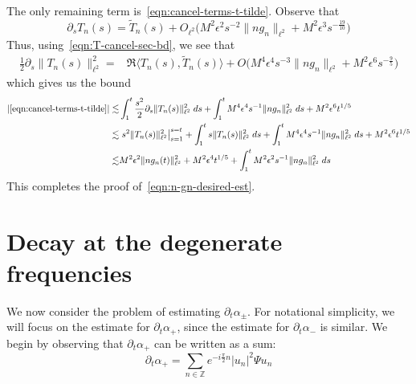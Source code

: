\documentclass[letterpaper, reqno,final]{amsart}
\newcommand{\bbZ}{\mathbb{Z}}
\begin{document}
The only remaining term is~\eqref{eqn:cancel-terms-t-tilde}.  Observe that
\begin{equation*}
    \partial_s T_n(s) = \tilde{T}_n(s) + O_{\ell^2}\bigl(M^2\epsilon^2 s^{-2} \lVert ng_n \rVert_{\ell^2} + M^2 \epsilon^3 s^{-\frac{19}{10}}\bigr)
\end{equation*}
Thus, using~\eqref{eqn:T-cancel-sec-bd}, we see that
\begin{equation*}\begin{split}
    \frac{1}{2}\partial_s \lVert T_n(s) \rVert_{\ell^2}^2 =& \Re \langle T_n(s), \tilde{T}_n(s) \rangle + O\bigl(M^4\epsilon^4 s^{-3} \lVert ng_n \rVert_{\ell^2} + M^2 \epsilon^6 s^{-\frac{9}{5}} \bigr)
\end{split}\end{equation*}
which gives us the bound
\begin{equation*}\begin{split}
    |\eqref{eqn:cancel-terms-t-tilde}| \lesssim& \int_1^t \frac{s^2}{2} \partial_s \lVert T_n(s) \rVert_{\ell^2}^2\;ds  + \int_1^t M^4\epsilon^4 s^{-1} \lVert ng_n \rVert_{\ell^2}^2\;ds + M^2\epsilon^6 t^{1/5}\\
    \lesssim& \left. s^2 \lVert T_n(s) \rVert_{\ell^2}^2 \right|_{s = 1}^{s=t} + \int_1^t s \lVert T_n(s) \rVert_{\ell^2}^2\;ds + \int_1^t M^4\epsilon^4 s^{-1} \lVert ng_n \rVert_{\ell^2}^2\;ds + M^2\epsilon^6 t^{1/5}\\
    \lesssim& M^2\epsilon^2 \lVert ng_n(t) \rVert_{\ell^2}^2 + M^2 \epsilon^4 t^{1/5} + \int_1^t M^2\epsilon^2 s^{-1} \lVert ng_n\rVert_{\ell^2}^2\;ds
\end{split}\end{equation*}
This completes the proof of~\eqref{eqn:n-gn-desired-est}.

\section{Decay at the degenerate frequencies\label{sec:degen-freq-decay}}

We now consider the problem of estimating $\partial_t \alpha_{\pm}$.  For notational simplicity, we will focus on the estimate for $\partial_t \alpha_+$, since the estimate for $\partial_t \alpha_{-}$ is similar.  We begin by observing that $\partial_t \alpha_+$ can be written as a sum:
\begin{equation}\label{eqn:dt-alpha-+-sum}
    \partial_t \alpha_+ = \sum_{n \in \bbZ} e^{-i\frac{\pi}{2}n} |u_n|^2 \Psi u_{n}
\end{equation}
\end{document}
